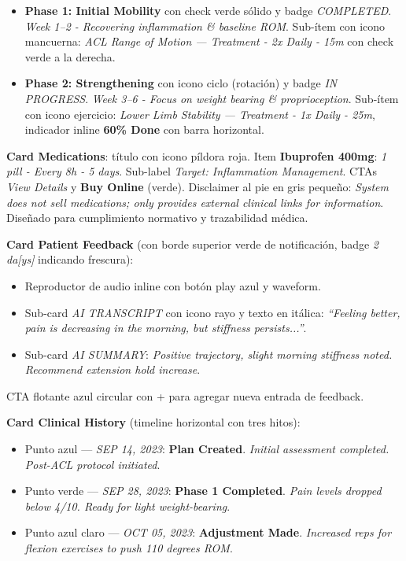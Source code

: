 \begin{itemize}
  \item \textbf{Phase 1: Initial Mobility} con check verde sólido y badge \textit{COMPLETED}. \textit{Week 1--2 - Recovering inflammation \& baseline ROM}. Sub-ítem con icono mancuerna: \textit{ACL Range of Motion --- Treatment - 2x Daily - 15m} con check verde a la derecha.

  \item \textbf{Phase 2: Strengthening} con icono ciclo (rotación) y badge \textit{IN PROGRESS}. \textit{Week 3--6 - Focus on weight bearing \& proprioception}. Sub-ítem con icono ejercicio: \textit{Lower Limb Stability --- Treatment - 1x Daily - 25m}, indicador inline \textbf{60\% Done} con barra horizontal.
\end{itemize}

\textbf{Card Medications}: título con icono píldora roja. Item \textbf{Ibuprofen 400mg}: \textit{1 pill - Every 8h - 5 days}. Sub-label \textit{Target: Inflammation Management}. CTAs \textit{View Details} y \textbf{Buy Online} (verde). Disclaimer al pie en gris pequeño: \textit{System does not sell medications; only provides external clinical links for information}. Diseñado para cumplimiento normativo y trazabilidad médica.

\textbf{Card Patient Feedback} (con borde superior verde de notificación, badge \textit{2 da[ys]} indicando frescura):

\begin{itemize}
  \item Reproductor de audio inline con botón play azul y waveform.
  \item Sub-card \textit{AI TRANSCRIPT} con icono rayo y texto en itálica: \textit{``Feeling better, pain is decreasing in the morning, but stiffness persists...''}.
  \item Sub-card \textit{AI SUMMARY}: \textit{Positive trajectory, slight morning stiffness noted. Recommend extension hold increase}.
\end{itemize}

CTA flotante azul circular con + para agregar nueva entrada de feedback.

\textbf{Card Clinical History} (timeline horizontal con tres hitos):

\begin{itemize}
  \item Punto azul --- \textit{SEP 14, 2023}: \textbf{Plan Created}. \textit{Initial assessment completed. Post-ACL protocol initiated}.
  \item Punto verde --- \textit{SEP 28, 2023}: \textbf{Phase 1 Completed}. \textit{Pain levels dropped below 4/10. Ready for light weight-bearing}.
  \item Punto azul claro --- \textit{OCT 05, 2023}: \textbf{Adjustment Made}. \textit{Increased reps for flexion exercises to push 110 degrees ROM}.
\end{itemize}

